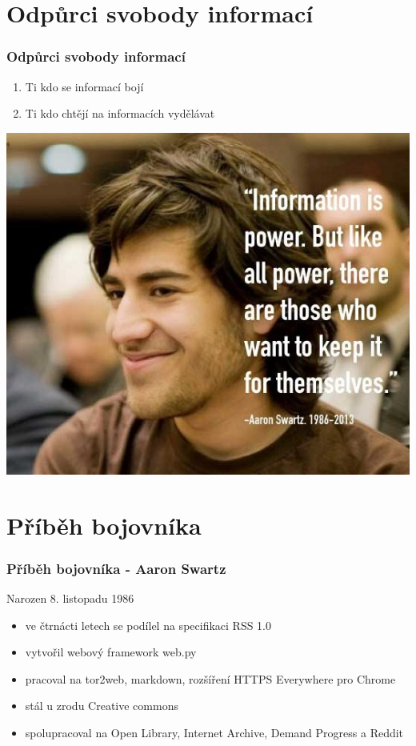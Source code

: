 \documentclass[xetex]{beamer}
\begin{document}
\section{Odpůrci svobody informací}
\begin{frame}
	\frametitle{Odpůrci svobody informací}
	\begin{enumerate}
		\item Ti kdo se informací bojí
		\item Ti kdo chtějí na informacích vydělávat
	\end{enumerate}

	\includegraphics[scale=0.3]{images/information.jpg}
\end{frame}

\section{Příběh bojovníka}
\begin{frame}
	\frametitle{Příběh bojovníka - Aaron Swartz}
	Narozen 8. listopadu 1986

	\begin{itemize}
		\item ve čtrnácti letech se podílel na specifikaci RSS 1.0
		\item vytvořil webový framework web.py
		\item pracoval na tor2web, markdown, rozšíření HTTPS Everywhere pro Chrome
		\item stál u zrodu Creative commons
		\item spolupracoval na Open Library, Internet Archive, Demand Progress a Reddit
	\end{itemize}

\end{frame}
\end{document}
